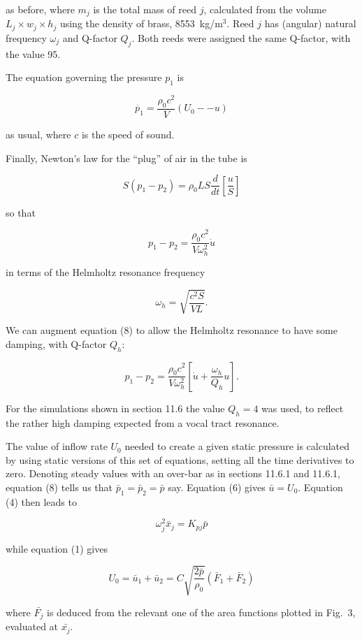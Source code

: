   \noindent{}as before, where $m_j$ is the total mass of reed $j$, calculated 
  from the volume $L_j \times w_j \times h_j$ using the density of brass, 
  8553~kg/m$^3$. Reed $j$ has (angular) natural frequency $\omega_j$ and 
  Q-factor $Q_j$. Both reeds were assigned the same Q-factor, with the value 
  95. 

  The equation governing the pressure $p_1$ is 

  \begin{equation*}\dot{p_1}=\dfrac{\rho_0 c^2}{V} (U_0 -- u) 
  \tag{6}\end{equation*} 

  \noindent{}as usual, where $c$ is the speed of sound. 

  Finally, Newton's law for the ``plug'' of air in the tube is 

  \begin{equation*}S(p_1-p_2) = \rho_0 L S 
  \dfrac{d}{dt}\left[\dfrac{u}{S}\right] \tag{7}\end{equation*} 

  \noindent{}so that 

  \begin{equation*}p_1-p_2=\dfrac{\rho_0 c^2}{V \omega_h^2} \dot{u} 
  \tag{8}\end{equation*} 

  \noindent{}in terms of the Helmholtz resonance frequency 

  \begin{equation*}\omega_h=\sqrt{\dfrac{c^2 S}{VL}}. \tag{9}\end{equation*} 

  We can augment equation (8) to allow the Helmholtz resonance to have some 
  damping, with Q-factor $Q_h$: 

  \begin{equation*}p_1-p_2=\dfrac{\rho_0 c^2}{V \omega_h^2} \left[\dot{u}+ 
  \dfrac{\omega_h}{Q_h}u \right] . \tag{10}\end{equation*} 

  For the simulations shown in section 11.6 the value $Q_h=4$ was used, to 
  reflect the rather high damping expected from a vocal tract resonance. 

  The value of inflow rate $U_0$ needed to create a given static pressure is 
  calculated by using static versions of this set of equations, setting all the 
  time derivatives to zero. Denoting steady values with an over-bar as in 
  sections 11.6.1 and 11.6.1, equation (8) tells us that 
  $\bar{p}_1=\bar{p}_2=\bar{p}$ say. Equation (6) gives $\bar{u}=U_0$. Equation 
  (4) then leads to 

  \begin{equation*}\omega_j^2 \bar{x}_j=K_{pj} \bar{p} \tag{11}\end{equation*} 

  \noindent{}while equation (1) gives 

  \begin{equation*}U_0=\bar{u}_1+\bar{u}_2= C \sqrt{\dfrac{2 \bar{p}}{\rho_0}} 
  (\bar{F}_1+\bar{F}_2) \tag{12}\end{equation*} 

  \noindent{}where $\bar{F_j}$ is deduced from the relevant one of the area 
  functions plotted in Fig.\ 3, evaluated at $\bar{x_j}$. 
